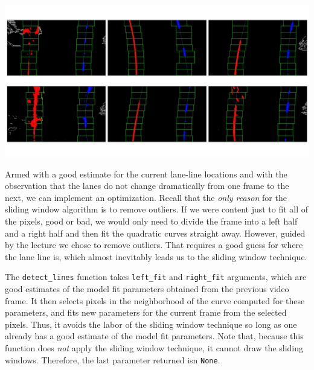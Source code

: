 \documentclass[11pt]{article}
\begin{document}
\includegraphics[width=.9\linewidth]{output_images/detected_lines_test_images.jpg}

Armed with a good estimate for the current lane-line locations
and with the observation that the lanes do not change
dramatically from one frame to the next, we can implement an
optimization.  Recall that the \emph{only reason} for the sliding
window algorithm is to remove outliers.  If we were content just
to fit all of the pixels, good or bad, we would only need to
divide the frame into a left half and a right half and then fit
the quadratic curves straight away.  However, guided by the
lecture we chose to remove outliers.  That requires a good guess
for where the lane line is, which almost inevitably leads us to
the sliding window technique.

The \texttt{detect\_lines} function takes \texttt{left\_fit} and \texttt{right\_fit}
arguments, which are good estimates of the model fit parameters
obtained from the previous video frame.  It then selects pixels
in the neighborhood of the curve computed for these parameters,
and fits new parameters for the current frame from the selected
pixels.  Thus, it avoids the labor of the sliding window
technique so long as one already has a good estimate of the
model fit parameters.  Note that, because this function does
\emph{not} apply the sliding window technique, it cannot draw the
sliding windows.  Therefore, the last parameter returned isn
\texttt{None}.  
\end{document}
